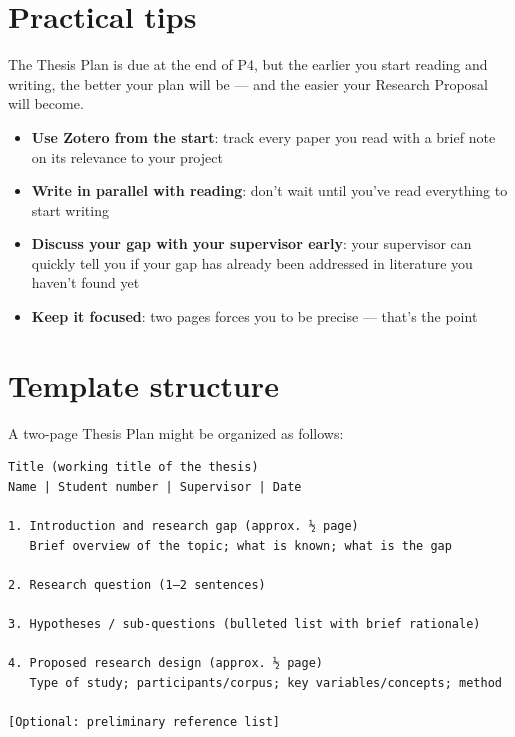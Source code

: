 \documentclass[
  11pt,
  a4paper,
]{scrbook}
\providecommand{\tightlist}{%
  \setlength{\itemsep}{0pt}\setlength{\parskip}{0pt}}\usepackage{longtable,booktabs,array}
\begin{document}
\section{Practical tips}\label{practical-tips}

\begin{tcolorbox}[enhanced jigsaw, bottomrule=.15mm, opacityback=0, toprule=.15mm, colframe=quarto-callout-tip-color-frame, left=2mm, rightrule=.15mm, title=\textcolor{quarto-callout-tip-color}{\faLightbulb}\hspace{0.5em}{Start earlier than you think}, colbacktitle=quarto-callout-tip-color!10!white, bottomtitle=1mm, colback=white, breakable, toptitle=1mm, titlerule=0mm, leftrule=.75mm, arc=.35mm, opacitybacktitle=0.6, coltitle=black]

The Thesis Plan is due at the end of P4, but the earlier you start
reading and writing, the better your plan will be --- and the easier
your Research Proposal will become.

\end{tcolorbox}

\begin{itemize}
\tightlist
\item
  \textbf{Use Zotero from the start}: track every paper you read with a
  brief note on its relevance to your project
\item
  \textbf{Write in parallel with reading}: don't wait until you've read
  everything to start writing
\item
  \textbf{Discuss your gap with your supervisor early}: your supervisor
  can quickly tell you if your gap has already been addressed in
  literature you haven't found yet
\item
  \textbf{Keep it focused}: two pages forces you to be precise ---
  that's the point
\end{itemize}

\section{Template structure}\label{template-structure}

A two-page Thesis Plan might be organized as follows:

\begin{verbatim}
Title (working title of the thesis)
Name | Student number | Supervisor | Date

1. Introduction and research gap (approx. ½ page)
   Brief overview of the topic; what is known; what is the gap

2. Research question (1–2 sentences)

3. Hypotheses / sub-questions (bulleted list with brief rationale)

4. Proposed research design (approx. ½ page)
   Type of study; participants/corpus; key variables/concepts; method

[Optional: preliminary reference list]
\end{verbatim}
\end{document}
